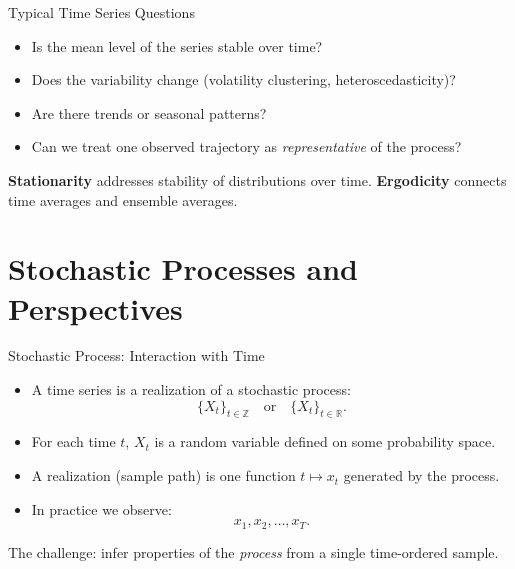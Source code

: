 \documentclass{beamer}
\begin{document}
\begin{frame}{Typical Time Series Questions}
  \begin{itemize}
    \item Is the mean level of the series stable over time?
    \item Does the variability change (volatility clustering, heteroscedasticity)?
    \item Are there trends or seasonal patterns?
    \item Can we treat one observed trajectory as \emph{representative} of the process?
  \end{itemize}

  \vspace{0.3cm}
  \textbf{Stationarity} addresses stability of distributions over time.  
  \textbf{Ergodicity} connects time averages and ensemble averages.
\end{frame}

\section{Stochastic Processes and Perspectives}

\begin{frame}{Stochastic Process: Interaction with Time}
  \begin{itemize}
    \item A time series is a realization of a stochastic process:
      \[
        \{X_t\}_{t \in \mathbb{Z}} \quad \text{or} \quad \{X_t\}_{t \in \mathbb{R}}.
      \]
    \item For each time $t$, $X_t$ is a random variable defined on some probability space.
    \item A realization (sample path) is one function $t \mapsto x_t$ generated by the process.
    \item In practice we observe:
      \[
        x_1, x_2, \dots, x_T.
      \]
  \end{itemize}

  The challenge: infer properties of the \emph{process} from a single time-ordered sample.
\end{frame}
\end{document}
